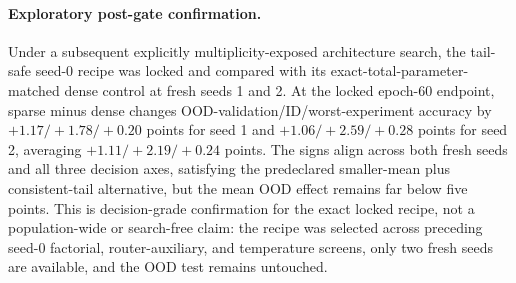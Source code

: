 \paragraph{Exploratory post-gate confirmation.}
Under a subsequent explicitly multiplicity-exposed architecture search, the tail-safe seed-0
recipe was locked and compared with its exact-total-parameter-matched dense control at fresh seeds
1 and 2. At the locked epoch-60 endpoint, sparse minus dense changes
OOD-validation/ID/worst-experiment accuracy by $+1.17/+1.78/+0.20$ points for seed 1 and
$+1.06/+2.59/+0.28$ points for seed 2, averaging $+1.11/+2.19/+0.24$ points. The signs align
across both fresh seeds and all three decision axes, satisfying the predeclared smaller-mean plus
consistent-tail alternative, but the mean OOD effect remains far below five points. This is
decision-grade confirmation for the exact locked recipe, not a population-wide or search-free
claim: the recipe was selected across preceding seed-0 factorial, router-auxiliary, and
temperature screens, only two fresh seeds are available, and the OOD test remains untouched.

